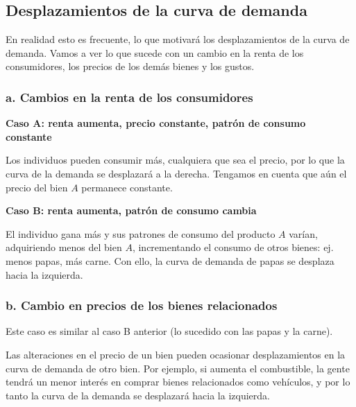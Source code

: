 \subsection{Desplazamientos de la curva de demanda}

En realidad esto es frecuente,
lo que motivará los desplazamientos de la curva de demanda.
Vamos a ver lo que sucede con un cambio en la renta de los consumidores,
los precios de los demás bienes y los gustos.

\subsubsection{a. Cambios en la renta de los consumidores}

\textbf{Caso A: renta aumenta, precio constante, patrón de consumo constante} 

Los individuos pueden consumir más,
cualquiera que sea el precio,
por lo que la curva de la demanda se desplazará a la derecha.
Tengamos en cuenta que aún el precio del bien \(A\)
permanece constante.

\begin{center}
\end{center}

\textbf{Caso B: renta aumenta, patrón de consumo cambia}

El individuo gana más y sus patrones de consumo del producto \(A\) varían,
adquiriendo menos del bien \(A\),
incrementando el consumo de otros bienes: 
ej. menos papas, más carne.
Con ello, la curva de demanda de papas se desplaza hacia la izquierda.

\subsubsection{b. Cambio en precios de los bienes relacionados}

Este caso es similar al caso B anterior
(lo sucedido con las papas y la carne).

Las alteraciones en el precio de un bien 
pueden ocasionar desplazamientos en la curva de demanda de otro bien. 
Por ejemplo, 
si aumenta el combustible, 
la gente tendrá un menor interés
en comprar bienes relacionados como vehículos,
y por lo tanto la curva de la demanda se desplazará hacia la izquierda.

